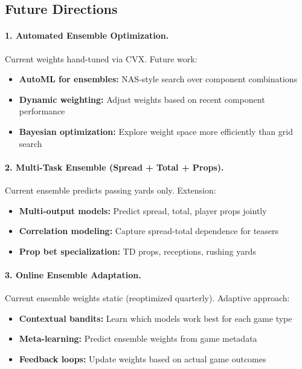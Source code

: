 \subsection{Future Directions}

\paragraph{1. Automated Ensemble Optimization.}
Current weights hand-tuned via CVX. Future work:
\begin{itemize}[itemsep=2pt,parsep=0pt]
    \item \textbf{AutoML for ensembles:} NAS-style search over component combinations
    \item \textbf{Dynamic weighting:} Adjust weights based on recent component performance
    \item \textbf{Bayesian optimization:} Explore weight space more efficiently than grid search
\end{itemize}

\paragraph{2. Multi-Task Ensemble (Spread + Total + Props).}
Current ensemble predicts passing yards only. Extension:
\begin{itemize}[itemsep=2pt,parsep=0pt]
    \item \textbf{Multi-output models:} Predict spread, total, player props jointly
    \item \textbf{Correlation modeling:} Capture spread-total dependence for teasers
    \item \textbf{Prop bet specialization:} TD props, receptions, rushing yards
\end{itemize}

\paragraph{3. Online Ensemble Adaptation.}
Current ensemble weights static (reoptimized quarterly). Adaptive approach:
\begin{itemize}[itemsep=2pt,parsep=0pt]
    \item \textbf{Contextual bandits:} Learn which models work best for each game type
    \item \textbf{Meta-learning:} Predict ensemble weights from game metadata
    \item \textbf{Feedback loops:} Update weights based on actual game outcomes
\end{itemize}

